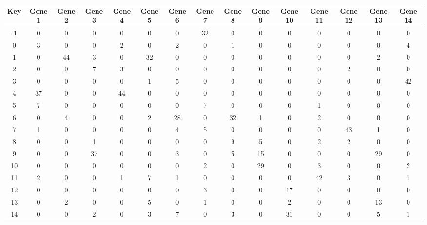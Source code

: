\begin{tabular}{|c|c|c|c|c|c|c|c|c|c|c|c|c|c|c|}
\hline
Key & Gene 1 & Gene 2 & Gene 3 & Gene 4 & Gene 5 & Gene 6 & Gene 7 & Gene 8 & Gene 9 & Gene 10 & Gene 11 & Gene 12 & Gene 13 & Gene 14 \\
\hline
-1 & 0 & 0 & 0 & 0 & 0 & 0 & 32 & 0 & 0 & 0 & 0 & 0 & 0 & 0 \\
0 & 3 & 0 & 0 & 2 & 0 & 2 & 0 & 1 & 0 & 0 & 0 & 0 & 0 & 4 \\
1 & 0 & 44 & 3 & 0 & 32 & 0 & 0 & 0 & 0 & 0 & 0 & 0 & 2 & 0 \\
2 & 0 & 0 & 7 & 3 & 0 & 0 & 0 & 0 & 0 & 0 & 0 & 2 & 0 & 0 \\
3 & 0 & 0 & 0 & 0 & 1 & 5 & 0 & 0 & 0 & 0 & 0 & 0 & 0 & 42 \\
4 & 37 & 0 & 0 & 44 & 0 & 0 & 0 & 0 & 0 & 0 & 0 & 0 & 0 & 0 \\
5 & 7 & 0 & 0 & 0 & 0 & 0 & 7 & 0 & 0 & 0 & 1 & 0 & 0 & 0 \\
6 & 0 & 4 & 0 & 0 & 2 & 28 & 0 & 32 & 1 & 0 & 2 & 0 & 0 & 0 \\
7 & 1 & 0 & 0 & 0 & 0 & 4 & 5 & 0 & 0 & 0 & 0 & 43 & 1 & 0 \\
8 & 0 & 0 & 1 & 0 & 0 & 0 & 0 & 9 & 5 & 0 & 2 & 2 & 0 & 0 \\
9 & 0 & 0 & 37 & 0 & 0 & 3 & 0 & 5 & 15 & 0 & 0 & 0 & 29 & 0 \\
10 & 0 & 0 & 0 & 0 & 0 & 0 & 2 & 0 & 29 & 0 & 3 & 0 & 0 & 2 \\
11 & 2 & 0 & 0 & 1 & 7 & 1 & 0 & 0 & 0 & 0 & 42 & 3 & 0 & 1 \\
12 & 0 & 0 & 0 & 0 & 0 & 0 & 3 & 0 & 0 & 17 & 0 & 0 & 0 & 0 \\
13 & 0 & 2 & 0 & 0 & 5 & 0 & 1 & 0 & 0 & 2 & 0 & 0 & 13 & 0 \\
14 & 0 & 0 & 2 & 0 & 3 & 7 & 0 & 3 & 0 & 31 & 0 & 0 & 5 & 1 \\
\hline
\end{tabular}